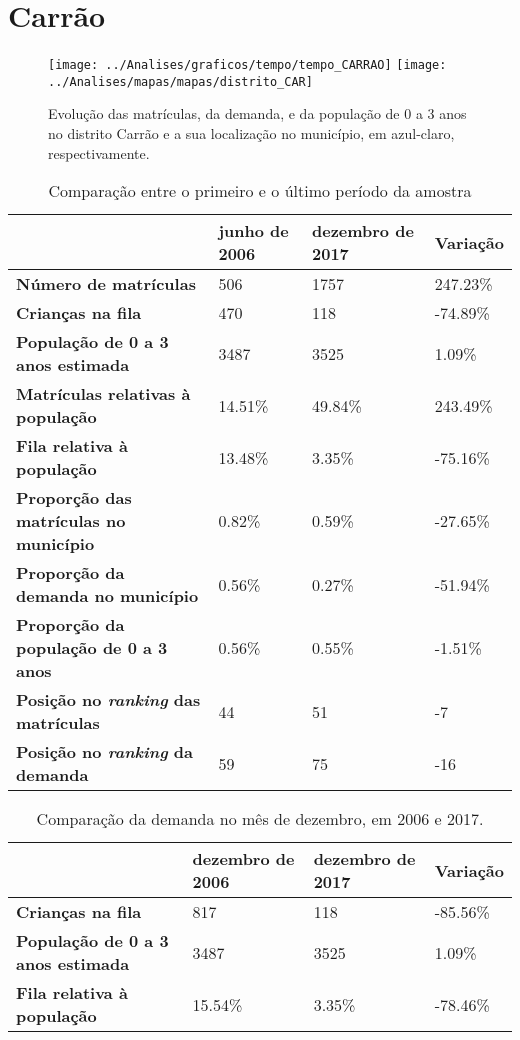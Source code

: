 \section{Carrão}
\begin{figure}[H]
\centering
\texttt{[image: ../Analises/graficos/tempo/tempo\_CARRAO]}
\texttt{[image: ../Analises/mapas/mapas/distrito\_CAR]}
\caption{Evolução das matrículas, da demanda, e da população de 0 a 3 anos no distrito Carrão e a sua localização no município, em azul-claro, respectivamente.}
\end{figure}
\begin{table}[H]
\begin{tabular}{l|l|l|l}
\textbf{}                                      & \textbf{junho de 2006}       & \textbf{dezembro de 2017}    & \textbf{Variação} \\ \hline
\textbf{Número de matrículas}                  & 506 & 1757 & 247.23\% \\ \hline
\textbf{Crianças na fila}                      & 470 & 118 & -74.89\% \\ \hline
\textbf{População de 0 a 3 anos estimada}      & 3487 & 3525 & 1.09\% \\ \hline
\textbf{Matrículas relativas à população}      & 14.51\% & 49.84\% & 243.49\% \\ \hline
\textbf{Fila relativa à população}             & 13.48\% & 3.35\% & -75.16\% \\ \hline
\textbf{Proporção das matrículas no município} & 0.82\% & 0.59\% & -27.65\% \\ \hline
\textbf{Proporção da demanda no município}     & 0.56\% & 0.27\% & -51.94\% \\ \hline
\textbf{Proporção da população de 0 a 3 anos}  & 0.56\% & 0.55\% & -1.51\% \\ \hline
\textbf{Posição no \textit{ranking} das matrículas}     & 44 & 51 & -7 \\ \hline
\textbf{Posição no \textit{ranking} da demanda}         & 59 & 75 & -16 \\ 
\end{tabular}
\caption{Comparação entre o primeiro e o último período da amostra}
\end{table}
\begin{table}[H]
\begin{tabular}{l|l|l|l}
\textbf{}                                 & \textbf{dezembro de 2006} & \textbf{dezembro de 2017} & \textbf{Variação} \\ \hline
\textbf{Crianças na fila}                      & 817 & 118 & -85.56\% \\ \hline
\textbf{População de 0 a 3 anos estimada}      & 3487 & 3525 & 1.09\% \\ \hline
\textbf{Fila relativa à população}             & 15.54\% & 3.35\% & -78.46\% \\
\end{tabular}
\caption{Comparação da demanda no mês de dezembro, em 2006 e 2017.}
\end{table}
